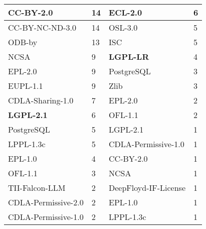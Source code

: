 \begin{table*}[]
\begin{tabular}{|ll||ll|}
    \multicolumn{1}{|l|}{CC-BY-2.0} & 14 & \multicolumn{1}{l|}{ECL-2.0} & 6 \\ \hline
    \multicolumn{1}{|l|}{CC-BY-NC-ND-3.0} & 14 & \multicolumn{1}{l|}{OSL-3.0} & 5 \\ \hline
    \multicolumn{1}{|l|}{ODB-by} & 13 & \multicolumn{1}{l|}{ISC} & 5 \\ \hline
    \multicolumn{1}{|l|}{NCSA} & 9 & \multicolumn{1}{l|}{\textbf{LGPL-LR}} & 4 \\ \hline
    \multicolumn{1}{|l|}{EPL-2.0} & 9 & \multicolumn{1}{l|}{PostgreSQL} & 3 \\ \hline
    \multicolumn{1}{|l|}{EUPL-1.1} & 9 & \multicolumn{1}{l|}{Zlib} & 3 \\ \hline
    \multicolumn{1}{|l|}{CDLA-Sharing-1.0} & 7 & \multicolumn{1}{l|}{EPL-2.0} & 2 \\ \hline
    \multicolumn{1}{|l|}{\textbf{LGPL-2.1}} & 6 & \multicolumn{1}{l|}{OFL-1.1} & 2 \\ \hline
    \multicolumn{1}{|l|}{PostgreSQL} & 5 & \multicolumn{1}{l|}{LGPL-2.1} & 1 \\ \hline
    \multicolumn{1}{|l|}{LPPL-1.3c} & 5 & \multicolumn{1}{l|}{CDLA-Permissive-1.0} & 1 \\ \hline
    \multicolumn{1}{|l|}{EPL-1.0} & 4 & \multicolumn{1}{l|}{CC-BY-2.0} & 1 \\ \hline
    \multicolumn{1}{|l|}{OFL-1.1} & 3 & \multicolumn{1}{l|}{NCSA} & 1 \\ \hline
    \multicolumn{1}{|l|}{TII-Falcon-LLM} & 2 & \multicolumn{1}{l|}{DeepFloyd-IF-License} & 1 \\ \hline
    \multicolumn{1}{|l|}{CDLA-Permissive-2.0} & 2 & \multicolumn{1}{l|}{EPL-1.0} & 1 \\ \hline
    \multicolumn{1}{|l|}{CDLA-Permissive-1.0} & 2 & \multicolumn{1}{l|}{LPPL-1.3c} & 1 \\ \hline
    \end{tabular}
\end{table*}